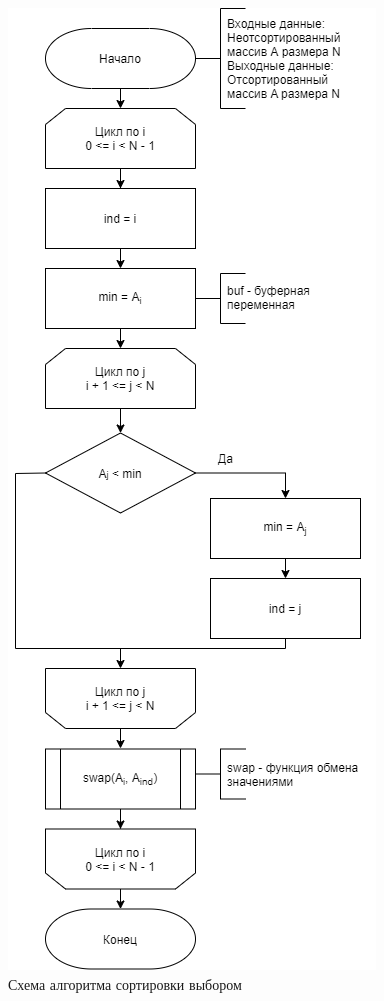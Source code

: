 \newpage 
\begin{figure}[h!]
	\begin{center}
		\includegraphics[scale=0.6]{assets/selectionSort.png}
	\end{center}
	\caption{Схема алгоритма сортировки выбором}
\end{figure}

